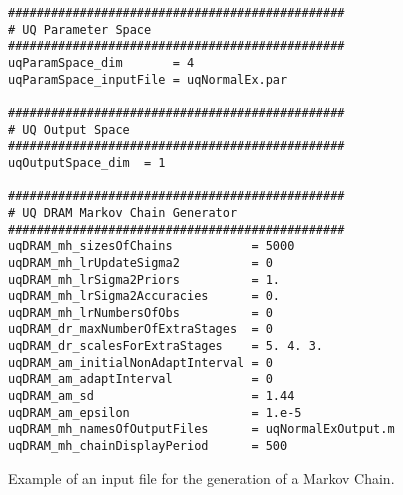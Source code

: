 \begin{figure}[h]
\begin{verbatim}
###############################################
# UQ Parameter Space
###############################################
uqParamSpace_dim       = 4
uqParamSpace_inputFile = uqNormalEx.par

###############################################
# UQ Output Space
###############################################
uqOutputSpace_dim  = 1

###############################################
# UQ DRAM Markov Chain Generator
###############################################
uqDRAM_mh_sizesOfChains           = 5000
uqDRAM_mh_lrUpdateSigma2          = 0
uqDRAM_mh_lrSigma2Priors          = 1.
uqDRAM_mh_lrSigma2Accuracies      = 0.
uqDRAM_mh_lrNumbersOfObs          = 0
uqDRAM_dr_maxNumberOfExtraStages  = 0
uqDRAM_dr_scalesForExtraStages    = 5. 4. 3.
uqDRAM_am_initialNonAdaptInterval = 0
uqDRAM_am_adaptInterval           = 0
uqDRAM_am_sd                      = 1.44
uqDRAM_am_epsilon                 = 1.e-5
uqDRAM_mh_namesOfOutputFiles      = uqNormalExOutput.m
uqDRAM_mh_chainDisplayPeriod      = 500
\end{verbatim}
\caption{Example of an input file for the generation of a Markov Chain.
}
\label{fig-dram-input-file-ex}
\end{figure}

